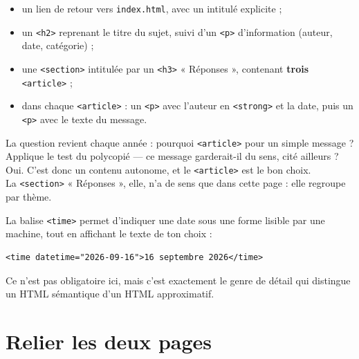 \documentclass[a4paper,11pt]{article}
\begin{document}
\begin{tcolorbox}[definition, title={À produire dans le \texttt{<main>} de \texttt{sujet.html}}]
\begin{itemize}
  \item un lien de retour vers \texttt{index.html}, avec un intitulé explicite ;
  \item un \texttt{<h2>} reprenant le titre du sujet, suivi d'un \texttt{<p>} d'information (auteur, date, catégorie) ;
  \item une \texttt{<section>} intitulée par un \texttt{<h3>} « Réponses », contenant \textbf{trois} \texttt{<article>} ;
  \item dans chaque \texttt{<article>} : un \texttt{<p>} avec l'auteur en \texttt{<strong>} et la date, puis un \texttt{<p>} avec le texte du message.
\end{itemize}
\end{tcolorbox}

\begin{tcolorbox}[attention, title={Un message est bien un \texttt{<article>}}]
La question revient chaque année : pourquoi \texttt{<article>} pour un simple message ? Applique le test du polycopié --- ce message garderait-il du sens, cité ailleurs ? Oui. C'est donc un contenu autonome, et le \texttt{<article>} est le bon choix.\\[4pt]
La \texttt{<section>} « Réponses », elle, n'a de sens que dans cette page : elle regroupe par thème.
\end{tcolorbox}

\begin{tcolorbox}[astuce, title={Pour aller un cran plus loin sur les dates}]
La balise \texttt{<time>} permet d'indiquer une date sous une forme lisible par une machine, tout en affichant le texte de ton choix :
\vspace{3pt}
\begin{lstlisting}[language=HTML5, numbers=none]
<time datetime="2026-09-16">16 septembre 2026</time>
\end{lstlisting}
\vspace{-3pt}
Ce n'est pas obligatoire ici, mais c'est exactement le genre de détail qui distingue un HTML sémantique d'un HTML approximatif.
\end{tcolorbox}

\section{Relier les deux pages}
\end{document}
